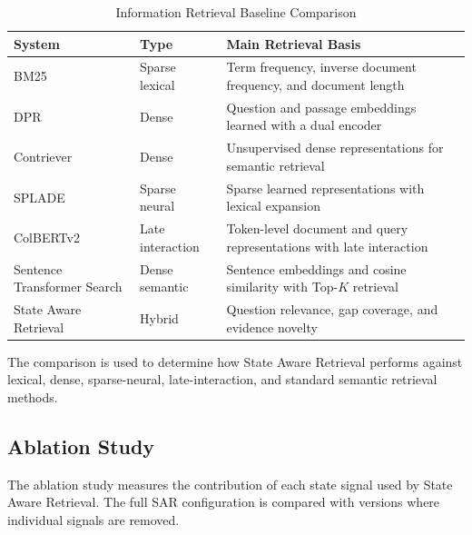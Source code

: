 \documentclass[12pt,a4paper]{report}
\begin{document}
\begin{table}[H]
\centering
\caption{Information Retrieval Baseline Comparison}
\label{tab:baseline-comparison}
\renewcommand{\arraystretch}{1.2}
\begin{tabular}{|p{1.55in}|p{1.40in}|p{3.10in}|}
\hline
\textbf{System} & \textbf{Type} & \textbf{Main Retrieval Basis} \\ \hline
BM25 & Sparse lexical &
Term frequency, inverse document frequency, and document length
\cite{robertson2009bm25} \\ \hline

DPR & Dense &
Question and passage embeddings learned with a dual encoder
\cite{karpukhin2020dpr} \\ \hline

Contriever & Dense &
Unsupervised dense representations for semantic retrieval
\cite{izacard2022contriever} \\ \hline

SPLADE & Sparse neural &
Sparse learned representations with lexical expansion
\cite{formal2021splade} \\ \hline

ColBERTv2 & Late interaction &
Token-level document and query representations with late interaction
\cite{santhanam2022colbertv2} \\ \hline

Sentence Transformer Search & Dense semantic &
Sentence embeddings and cosine similarity with Top-$K$ retrieval
\cite{reimers2019sentence} \\ \hline

State Aware Retrieval & Hybrid &
Question relevance, gap coverage, and evidence novelty \\ \hline
\end{tabular}
\end{table}

The comparison is used to determine how State Aware Retrieval performs
against lexical, dense, sparse-neural, late-interaction, and standard
semantic retrieval methods.

\subsection{Ablation Study}

The ablation study measures the contribution of each state signal used
by State Aware Retrieval. The full SAR configuration is compared with
versions where individual signals are removed.
\end{document}
